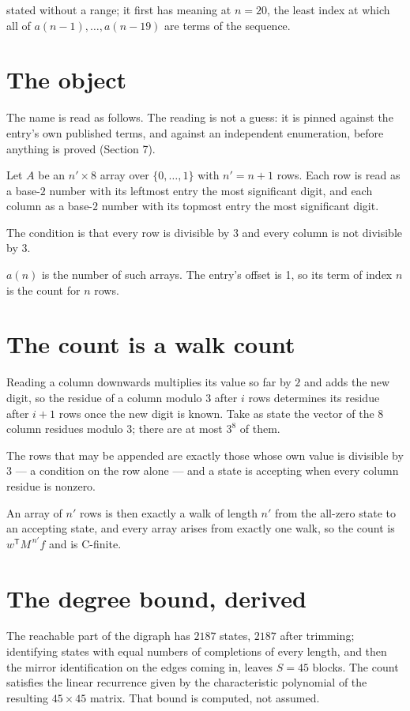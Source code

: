 \documentclass[11pt]{article}
\theoremstyle{definition}
\begin{document}
stated without a range; it first has meaning at $n = 20$, the least index at which all of $a(n-1),\dots,a(n-19)$ are terms of the sequence.

\section{The object}

The name is read as follows. The reading is not a guess: it is pinned against the entry's own published terms, and against an independent enumeration, before anything is proved (Section 7).

Let $A$ be an $n' \times 8$ array over $\{0,\dots,1\}$ with $n' = n + 1$ rows. Each row is read as a base-$2$ number with its leftmost entry the most significant digit, and each column as a base-$2$ number with its topmost entry the most significant digit.

The condition is that every row is divisible by $3$ and every column is not divisible by $3$.

$a(n)$ is the number of such arrays. The entry's offset is 1, so its term of index $n$ is the count for $n$ rows.

\section{The count is a walk count}

Reading a column downwards multiplies its value so far by $2$ and adds the new digit, so the residue of a column modulo $3$ after $i$ rows determines its residue after $i+1$ rows once the new digit is known. Take as state the vector of the $8$ column residues modulo $3$; there are at most $3^{8}$ of them.

The rows that may be appended are exactly those whose own value is divisible by $3$ --- a condition on the row alone --- and a state is accepting when every column residue is nonzero.

An array of $n'$ rows is then exactly a walk of length $n'$ from the all-zero state to an accepting state, and every array arises from exactly one walk, so the count is $w^{\mathsf T}M^{\,n'}f$ and is C-finite.

\section{The degree bound, derived}

The reachable part of the digraph has $2187$ states, $2187$ after trimming; identifying states with equal numbers of completions of every length, and then the mirror identification on the edges coming in, leaves $S = 45$ blocks. The count satisfies the linear recurrence given by the characteristic polynomial of the resulting $45\times45$ matrix. That bound is computed, not assumed.
\end{document}
